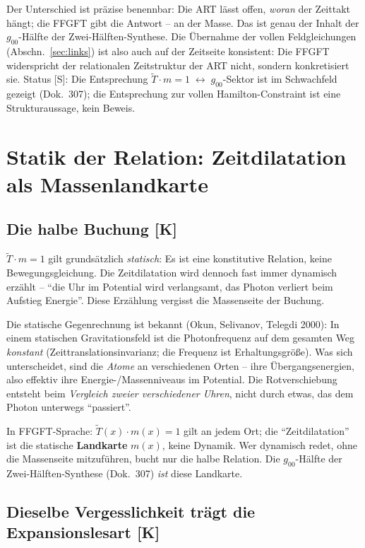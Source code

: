 \documentclass[11pt]{report}
\begin{document}
Der Unterschied ist präzise benennbar: Die ART lässt offen,
\emph{woran} der Zeittakt hängt; die FFGFT gibt die Antwort -- an
der Masse. Das ist genau der Inhalt der $g_{00}$-Hälfte der
Zwei-Hälften-Synthese. Die Übernahme der vollen Feldgleichungen
(Abschn.~\ref{sec:links}) ist also auch auf der Zeitseite konsistent: Die FFGFT
widerspricht der relationalen Zeitstruktur der ART nicht, sondern
konkretisiert sie. Status [S]: Die Entsprechung
$\tilde T \cdot m = 1 \;\leftrightarrow\; g_{00}$-Sektor ist im
Schwachfeld gezeigt (Dok.~307); die Entsprechung zur vollen
Hamilton-Constraint ist eine Strukturaussage, kein Beweis.

\chapter{Statik der Relation: Zeitdilatation als Massenlandkarte}

\section{Die halbe Buchung [K]}

$\tilde T \cdot m = 1$ gilt grundsätzlich \emph{statisch}: Es ist
eine konstitutive Relation, keine Bewegungsgleichung. Die
Zeitdilatation wird dennoch fast immer dynamisch erzählt --
\enquote{die Uhr im Potential wird verlangsamt, das Photon verliert
beim Aufstieg Energie}. Diese Erzählung vergisst die Massenseite
der Buchung.

Die statische Gegenrechnung ist bekannt (Okun, Selivanov, Telegdi
2000): In einem statischen Gravitationsfeld ist die Photonfrequenz
auf dem gesamten Weg \emph{konstant} (Zeittranslationsinvarianz;
die Frequenz ist Erhaltungsgröße). Was sich unterscheidet, sind die
\emph{Atome} an verschiedenen Orten -- ihre Übergangsenergien, also
effektiv ihre Energie-/Massenniveaus im Potential. Die
Rotverschiebung entsteht beim \emph{Vergleich zweier verschiedener
Uhren}, nicht durch etwas, das dem Photon unterwegs
\enquote{passiert}.

In FFGFT-Sprache: $\tilde T(x)\cdot m(x) = 1$ gilt an jedem Ort;
die \enquote{Zeitdilatation} ist die statische \textbf{Landkarte}
$m(x)$, keine Dynamik. Wer dynamisch redet, ohne die Massenseite
mitzuführen, bucht nur die halbe Relation. Die $g_{00}$-Hälfte der
Zwei-Hälften-Synthese (Dok.~307) \emph{ist} diese Landkarte.

\section{Dieselbe Vergesslichkeit trägt die Expansionslesart [K]}
\end{document}
